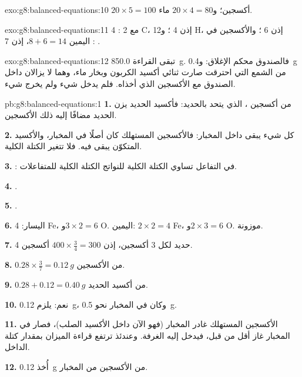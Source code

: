 \begin{solution}{exo:g8:balanced-equations:10}
$20 \times 5 = 100$  أكسجين؛ و$20 \times 4 = 80$ 
ماء.
\end{solution}

\begin{solution}{exo:g8:balanced-equations:11}
مع 2 : 4 C، إذن 4 ؛ و12 H، إذن 6 ؛ والأكسجين في
اليمين $8 + 6 = 14$، إذن 7 :
.
\end{solution}

\begin{solution}{exo:g8:balanced-equations:12}
تبقى القراءة \qty{850.0}{g}. فالصندوق محكم الإغلاق: و\qty{0.4}{g} من الشمع
التي احترقت صارت ثنائي أكسيد الكربون وبخار ماء، وهما لا يزالان داخل
الصندوق مع الأكسجين الذي أخذاه. فلم يدخل شيء ولم يخرج شيء.
\end{solution}

\begin{solution}{pb:g8:balanced-equations:1}
\textbf{1.} من أكسجين ، الذي يتحد بالحديد: فأكسيد الحديد يزن الحديد
مضافًا إليه ذلك الأكسجين.

\textbf{2.} كل شيء يبقى داخل المخبار: فالأكسجين المستهلك كان أصلًا في
المخبار، والأكسيد المتكوّن يبقى فيه. فلا تتغير الكتلة
الكلية.

\textbf{3.} : في التفاعل تساوي الكتلة الكلية للنواتج الكتلة
الكلية للمتفاعلات.

\textbf{4.} .

\textbf{5.} .

\textbf{6.} اليسار: 4 Fe، و$3 \times 2 = 6$ O. اليمين: $2 \times 2 = 4$ Fe،
و$2 \times 3 = 6$ O. موزونة.

\textbf{7.} 4  حديد لكل 3  أكسجين، إذن $400 \times
\frac{3}{4} = 300$  أكسجين.

\textbf{8.} $0.28 \times \frac{3}{7} = \qty{0.12}{g}$ من الأكسجين.

\textbf{9.} $0.28 + 0.12 = \qty{0.40}{g}$ من أكسيد الحديد.

\textbf{10.} نعم: يلزم \qty{0.12}{g}، وكان في المخبار نحو
\qty{0.5}{g}.

\textbf{11.} الأكسجين المستهلك غادر  المخبار (فهو الآن داخل الأكسيد
الصلب)، فصار في المخبار غاز أقل من قبل، فيدخل إليه  الغرفة. وعندئذ
ترتفع قراءة الميزان بمقدار كتلة  الداخل.

\textbf{12.} أُخذ \qty{0.12}{g} من الأكسجين من  المخبار.
\end{solution}
